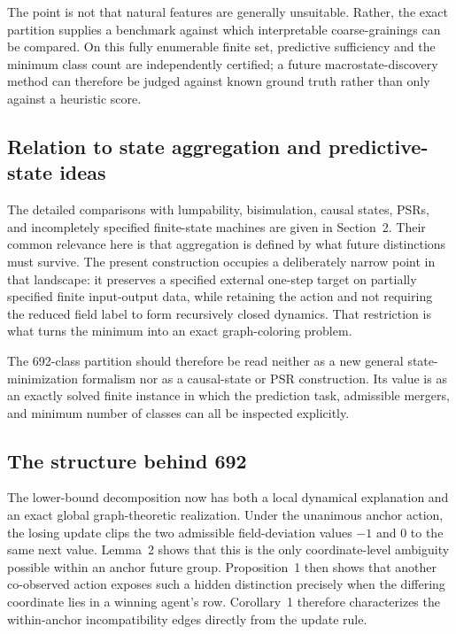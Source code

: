 \documentclass[
  11pt,
]{article}
\begin{document}
The point is not that natural features are generally unsuitable. Rather,
the exact partition supplies a benchmark against which interpretable
coarse-grainings can be compared. On this fully enumerable finite set,
predictive sufficiency and the minimum class count are independently
certified; a future macrostate-discovery method can therefore be judged
against known ground truth rather than only against a heuristic score.

\hypertarget{relation-to-state-aggregation-and-predictive-state-ideas}{%
\subsection{Relation to state aggregation and predictive-state
ideas}\label{relation-to-state-aggregation-and-predictive-state-ideas}}

The detailed comparisons with lumpability, bisimulation, causal states,
PSRs, and incompletely specified finite-state machines are given in
Section~2. Their common relevance here is that aggregation is defined by
what future distinctions must survive. The present construction occupies
a deliberately narrow point in that landscape: it preserves a specified
external one-step target on partially specified finite input-output data,
while retaining the action and not requiring the reduced field label to
form recursively closed dynamics. That restriction is what turns the
minimum into an exact graph-coloring problem.

The 692-class partition should therefore be read neither as a new general
state-minimization formalism nor as a causal-state or PSR construction.
Its value is as an exactly solved finite instance in which the prediction
task, admissible mergers, and minimum number of classes can all be
inspected explicitly.

\subsection{The structure behind 692}\label{the-structure-behind-692}

The lower-bound decomposition now has both a local dynamical explanation
and an exact global graph-theoretic realization. Under the unanimous
anchor action, the losing update clips the two admissible field-deviation
values \(-1\) and \(0\) to the same next value. Lemma~2 shows that this is
the only coordinate-level ambiguity possible within an anchor future
group. Proposition~1 then shows that another co-observed action exposes
such a hidden distinction precisely when the differing coordinate lies
in a winning agent's row. Corollary~1 therefore characterizes the
within-anchor incompatibility edges directly from the update rule.
\end{document}
